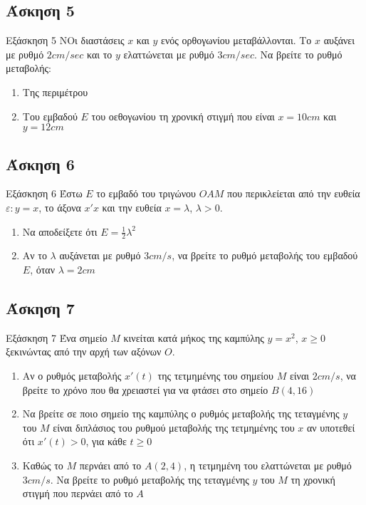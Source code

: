 \documentclass[greek]{beamer}
\begin{document}
\subsection{Άσκηση 5}
\begin{frame}[label=Άσκηση5]{Εξάσκηση 5}
 ΝΟι διαστάσεις $x$ και $y$ ενός ορθογωνίου μεταβάλλονται. Το $x$ αυξάνει με ρυθμό $2cm/sec$ και το $y$ ελαττώνεται με ρυθμό $3cm/sec$. Να βρείτε το ρυθμό μεταβολής:
 \begin{enumerate}
  \item<1-> Της περιμέτρου
  \item<2-> Του εμβαδού $Ε$ του οεθογωνίου τη χρονική στιγμή που είναι $x=10cm$ και $y=12cm$
 \end{enumerate}

\end{frame}

\subsection{Άσκηση 6}
\begin{frame}[label=Άσκηση6]{Εξάσκηση 6}
 Έστω $Ε$ το εμβαδό του τριγώνου $ΟΑΜ$ που περικλείεται από την ευθεία $ε:y=x$, το άξονα $x'x$ και την ευθεία $x=λ$, $λ>0$.
 \begin{enumerate}
  \item<1-> Να αποδείξετε ότι $Ε=\frac{1}{2}λ^2$
  \item<2-> Αν το $λ$ αυξάνεται με ρυθμό $3cm/s$, να βρείτε το ρυθμό μεταβολής του εμβαδού $Ε$, όταν $λ=2cm$
 \end{enumerate}

\end{frame}

\subsection{Άσκηση 7}
\begin{frame}[label=Άσκηση7]{Εξάσκηση 7}
 Ένα σημείο $Μ$ κινείται κατά μήκος της καμπύλης $y=x^2$, $x\ge0$ ξεκινώντας από την αρχή των αξόνων $Ο$.
 \begin{enumerate}
  \item<1-> Αν ο ρυθμός μεταβολής $x'(t)$ της τετμημένης του σημείου $Μ$ είναι $2cm/s$, να βρείτε το χρόνο που θα χρειαστεί για να φτάσει στο σημείο $Β(4,16)$
  \item<2-> Να βρείτε σε ποιο σημείο της καμπύλης ο ρυθμός μεταβολής της τεταγμένης $y$ του $Μ$ είναι διπλάσιος του ρυθμού μεταβολής της τετμημένης του $x$ αν υποτεθεί ότι $x'(t)>0$, για κάθε $t\ge0$
  \item<3-> Καθώς το $Μ$ περνάει από το $Α(2,4)$, η τετμημένη του ελαττώνεται με ρυθμό $3cm/s$. Να βρείτε το ρυθμό μεταβολής της τεταγμένης $y$ του $Μ$ τη χρονική στιγμή που περνάει από το $Α$
 \end{enumerate}

\end{frame}
\end{document}
